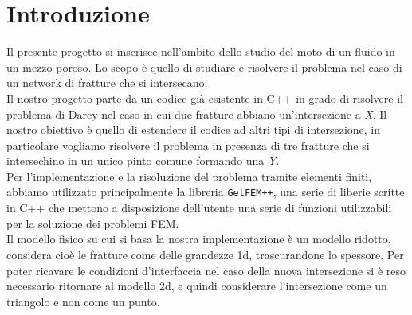 \chapter*{Introduzione}

Il presente progetto si inserisce nell'ambito dello studio del moto di un fluido in un mezzo poroso.\cite{habilitationsschrift}
Lo scopo è quello di studiare e risolvere il problema nel caso di un network di fratture che si intersecano. \\
Il nostro progetto parte da un codice già esistente in C++ in grado di risolvere il problema di Darcy nel caso in cui due fratture abbiano un'intersezione a \textit{X}. \cite{ESAIM}
Il nostro obiettivo è quello di estendere il codice ad altri tipi di intersezione, in particolare vogliamo risolvere il problema in presenza di tre fratture che si intersechino in un unico pinto comune formando una \textit{Y}.\\
Per l'implementazione e la risoluzione del problema tramite elementi finiti, abbiamo utilizzato principalmente la libreria \texttt{GetFEM++}, una serie di liberie scritte in C++ che mettono a disposizione dell'utente una serie di funzioni utilizzabili per la soluzione dei problemi FEM. \\
Il modello fisico  su cui si basa la nostra implementazione è un modello ridotto, considera cioè le fratture come delle grandezze 1d, trascurandone lo spessore. Per poter ricavare le condizioni d'interfaccia nel caso della nuova intersezione si è reso necessario ritornare al modello 2d, e quindi considerare l'intersezione come un triangolo e non come un punto. \cite{Paper} \cite{LDAP}
